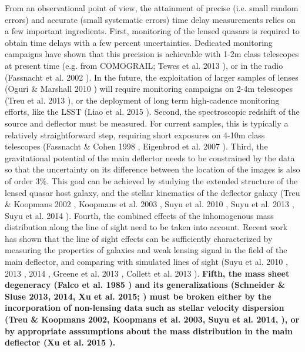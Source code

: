 \documentclass[a4paper,11pt]{article}
\begin{document}
From an observational point of view, the attainment of precise
(i.e. small random errors) and accurate (small systematic errors) time
delay measurements relies on a few important ingredients. First,
monitoring of the lensed quasars is required to obtain time delays
with a few percent uncertainties. Dedicated monitoring campaigns have
shown that this precision is achievable with 1-2m class telescopes at
present time (e.g. from COMOGRAIL; Tewes et al. 2013
\citep{2013A&A...556A..22T}), or in the radio (Fassnacht et al. 2002
\citep{2002ApJ...581..823F}). In the future, the exploitation of
larger samples of lenses (Oguri \& Marshall 2010
\cite{2010MNRAS.405.2579O}) will require monitoring campaigns on 2-4m
telescopes (Treu et al. 2013 \citep{2013arXiv1306.1272T}), or the
deployment of long term high-cadence monitoring efforts, like the LSST
(Liao et al. 2015 \citep{2015ApJ...800...11L}). Second, the
spectroscopic redshift of the source and deflector must be measured.
For current samples, this is typically a relatively straightforward
step, requiring short exposures on 4-10m class telescopes (Fassnacht \&
Cohen 1998 \citep{1998AJ....115..377F}, Eigenbrod et al. 2007
\citep{2007A&A...465...51E}).  Third, the gravitational potential of
the main deflector needs to be constrained by the data so that the
uncertainty on its difference between the location of the images is
also of order 3\%. This goal can be achieved by studying the extended
structure of the lensed quasar host galaxy, and the stellar kinematics
of the deflector galaxy (Treu \& Koopmans 2002
\citep{2002MNRAS.337L...6T}, Koopmans et al. 2003
\citep{2003ApJ...599...70K}, Suyu et al. 2010
\citep{2010ApJ...711..201S}, Suyu et al. 2013
\citep{2013ApJ...766...70S}, Suyu et al. 2014
\cite{2014ApJ...788L..35S}).  Fourth, the combined effects of the
inhomogenous mass distribution along the line of sight need to be
taken into account. Recent work has shown that the line of sight
effects can be sufficiently characterized by measuring the properties
of galaxies and weak lensing signal in the field of the main
deflector, and comparing with simulated lines of sight (Suyu et al.
2010 \citep{2010ApJ...711..201S}, 2013 \citep{2013ApJ...766...70S},
2014 \citep{2014ApJ...788L..35S}, Greene et al. 2013
\citep{2013ApJ...768...39G}, Collett et al. 2013
\citep{2013MNRAS.432..679C}). {\bf Fifth, the mass sheet degeneracy (Falco et 
al. 1985 \cite{FGS85}) and its generalizations (Schneider \& Sluse
2013, 2014, Xu et al. 2015; \cite{SS13,SS14,Xu15}) must be broken
either by the incorporation of non-lensing data such as stellar
velocity dispersion (Treu \& Koopmans 2002, Koopmans et al. 2003, Suyu
et al. 2014,
\cite{2002MNRAS.337L...6T,2003ApJ...599...70K,2014ApJ...788L..35S}),
or by appropriate asssumptions about the mass distribution in the main
deflector (Xu et al. 2015 \citep{Xu15}).}
  
\end{document}
